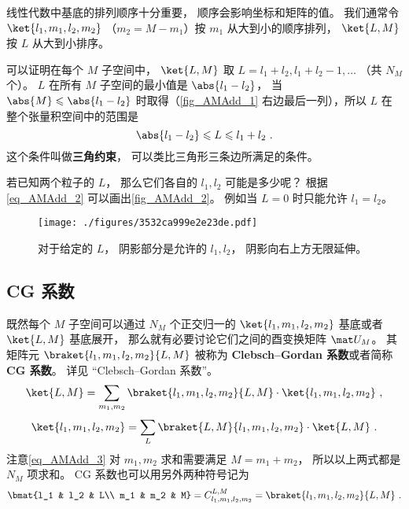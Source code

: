 线性代数中基底的排列顺序十分重要， 顺序会影响坐标和矩阵的值。 我们通常令 $\ket{l_1, m_1, l_2, m_2}$ （$m_2 = M - m_1$）按 $m_1$ 从大到小的顺序排列， $\ket{L, M}$ 按 $L$ 从大到小排序。

可以证明在每个 $M$ 子空间中， $\ket{L, M}$ 取 $L = l_1 + l_2, l_1 + l_2 - 1,\dots$ （共 $N_M$ 个）。 %
$L$ 在所有 $M$ 子空间的最小值是 $\abs{l_1 - l_2}$， 当 $\abs{M} \leqslant \abs{l_1 - l_2}$ 时取得（\autoref{fig_AMAdd_1} 右边最后一列），所以 $L$ 在整个张量积空间中的范围是
\begin{equation}\label{eq_AMAdd_2}
\abs{l_1 - l_2} \leqslant L \leqslant l_1 + l_2~.
\end{equation}
这个条件叫做\textbf{三角约束}， 可以类比三角形三条边所满足的条件。

若已知两个粒子的 $L$， 那么它们各自的 $l_1, l_2$ 可能是多少呢？ 根据\autoref{eq_AMAdd_2} 可以画出\autoref{fig_AMAdd_2}。 例如当 $L = 0$ 时只能允许 $l_1 = l_2$。
\begin{figure}[ht]
\centering
\texttt{[image: ./figures/3532ca999e2e23de.pdf]}
\caption{对于给定的 $L$， 阴影部分是允许的 $l_1, l_2$， 阴影向右上方无限延伸。} \label{fig_AMAdd_2}
\end{figure}

\subsection{CG 系数}
既然每个 $M$ 子空间可以通过 $N_M$ 个正交归一的 $\ket{l_1, m_1, l_2, m_2}$ 基底或者 $\ket{L,M}$ 基底展开， 那么就有必要讨论它们之间的酉变换矩阵 $\mat U_M$。 其矩阵元 $\braket{l_1, m_1, l_2, m_2}{L, M}$ 被称为 \textbf{Clebsch–Gordan 系数}或者简称 \textbf{CG 系数}。 详见 “Clebsch–Gordan 系数”。
\begin{equation}\label{eq_AMAdd_3}
\ket{L, M} = \sum_{m_1, m_2}\braket{l_1, m_1, l_2, m_2}{L, M} \cdot \ket{l_1, m_1, l_2, m_2}~,
\end{equation}
\begin{equation}
\ket{l_1, m_1, l_2, m_2} = \sum_{L}\braket{L, M}{l_1, m_1, l_2, m_2} \cdot \ket{L, M}~.
\end{equation}
注意\autoref{eq_AMAdd_3} 对 $m_1,m_2$ 求和需要满足 $M = m_1 + m_2$， 所以以上两式都是 $N_M$ 项求和。 CG 系数也可以用另外两种符号记为
\begin{equation}
\bmat{l_1 & l_2 & L\\ m_1 & m_2 & M} = C_{l_1, m_1, l_2, m_2}^{L, M} = \braket{l_1, m_1, l_2, m_2}{L, M}~.
\end{equation}

